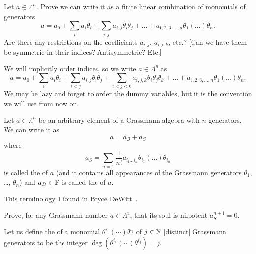 \begin{exercise}
Let $a\in\Lambda^{n}$. Prove we can write it as a finite linear
combination of monomials of generators
\begin{equation}
a = a_{0} + \sum_{i}a_{i}\theta_{i} +
\sum_{i,j}a_{i,j}\theta_{i}\theta_{j} + \dots + a_{1,2,3,\dots,n}\theta_{1}(\dots)\theta_{n}.
\end{equation}
Are there any restrictions on the coefficients $a_{i,j}$, $a_{i,j,k}$,
etc.? [Can we have them be symmetric in their indices? Antisymmetric? Etc.]
\end{exercise}

We will implicitly order indices, so we write $a\in\Lambda^{n}$ as
\begin{equation}
a = a_{0} + \sum_{i}a_{i}\theta_{i} +
\sum_{i<j}a_{i,j}\theta_{i}\theta_{j} +
\sum_{i<j<k}a_{i,j,k}\theta_{i}\theta_{j}\theta_{k} +
\dots + a_{1,2,3,\dots,n}\theta_{1}(\dots)\theta_{n}.
\end{equation}
We may be lazy and forget to order the dummy variables, but it is the
convention we will use from now on.

\begin{definition}
Let $a\in\Lambda^{n}$ be an arbitrary element of a Grassmann algebra
with $n$ generators. We can write it as
\begin{equation}
a = a_{B} + a_{S}
\end{equation}
where
\begin{equation}
a_{S} = \sum_{n=1}\frac{1}{n!}a_{i_{1}\dots i_{n}}\theta_{i_{1}}(\dots)\theta_{i_{n}}
\end{equation}
is called the  of $a$ (and it contains all appearances of the
Grassmann generators $\theta_{1}$, \dots, $\theta_{n}$) and
$a_{B}\in\mathbb{F}$ is called the  of $a$.
\end{definition}

\begin{remark}
This terminology I found in Bryce DeWitt~\cite{DeWitt:2012mdz}.
\end{remark}

\begin{exercise}
Prove, for any Grassmann number $a\in\Lambda^{n}$, that its soul is nilpotent $a_{S}^{n+1}=0$.
\end{exercise}

\begin{definition}
Let us define the  of a monomial
$\theta^{i_{1}}(\cdots)\theta^{i_{j}}$ of $j\in\mathbb{N}$ [distinct] Grassmann generators
to be the integer $\deg(\theta^{i_{1}}(\cdots)\theta^{i_{j}})=j$.
\end{definition}

